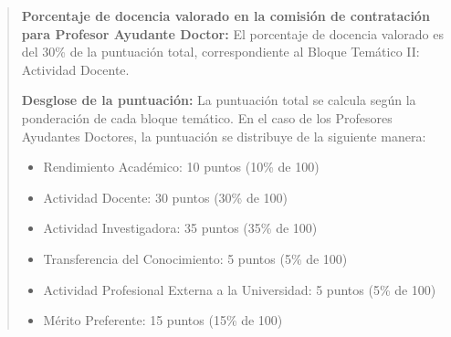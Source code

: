 \documentclass[12pt,a4paper,oneside]{report}
\begin{document}
\begin{itemize}
\begin{itemize}
\begin{quote}
\textbf{Porcentaje de docencia valorado en la comisión de contratación para Profesor Ayudante Doctor:}
El porcentaje de docencia valorado es del 30\% de la puntuación total, correspondiente al Bloque Temático II: Actividad Docente.

\textbf{Desglose de la puntuación:}
La puntuación total se calcula según la ponderación de cada bloque temático. En el caso de los Profesores Ayudantes Doctores, la puntuación se distribuye de la siguiente manera:
\begin{itemize}
  \item Rendimiento Académico: 10 puntos (10\% de 100)
  \item Actividad Docente: 30 puntos (30\% de 100)
  \item Actividad Investigadora: 35 puntos (35\% de 100)
  \item Transferencia del Conocimiento: 5 puntos (5\% de 100)
  \item Actividad Profesional Externa a la Universidad: 5 puntos (5\% de 100)
  \item Mérito Preferente: 15 puntos (15\% de 100)
\end{itemize}


\end{quote}
\end{itemize}
\end{itemize}
\end{document}
